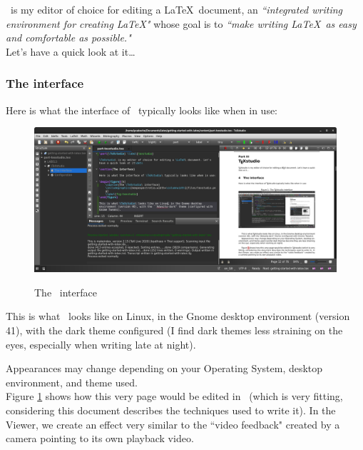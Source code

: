 
\part{\TeXstudio} \label{texstudio}


\TeXstudio\ is my editor of choice for editing a \LaTeX\ document, an \emph{``integrated writing environment for creating \LaTeX"} whose goal is to \emph{``make writing \LaTeX\ as easy and comfortable as possible."} \citep{texstudio} \\

 Let's have a quick look at it\dots

\section{The interface}

Here is what the interface of \TeXstudio\ typically looks like when in use:

\begin{figure}[h]
	\caption{The \TeXstudio\ interface}
	\includegraphics[keepaspectratio,width=\columnwidth]{files/texstudio.png}
	\label{fig:texstudio}
\end{figure}

This is what \TeXstudio\ looks like on Linux, in the Gnome desktop environment (version 41), with the dark theme configured (I find dark themes less straining on the eyes, especially when writing late at night).

Appearances may change depending on your Operating System, desktop environment, and theme used. \\

Figure \ref{fig:texstudio} shows how this very page would be edited in \TeXstudio\ (which is very fitting, considering this document describes the techniques used to write it). In the Viewer, we create an effect very similar to the ``video feedback" created by a camera pointing to its own playback video. \\

